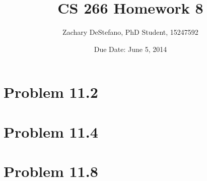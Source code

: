 \documentclass[11pt,psfig]{article}
\begin{document}
\setlength{\parskip}{1.2ex plus0.3ex minus 0.3ex}


\thispagestyle{empty} \pagestyle{myheadings} 



\title{CS 266 Homework 8}
\author{Zachary DeStefano, PhD Student, 15247592}
\date{Due Date: June 5, 2014}

\maketitle

\vfill\eject

\section*{Problem 11.2}



\section*{Problem 11.4}

\section*{Problem 11.8}
\end{document}
